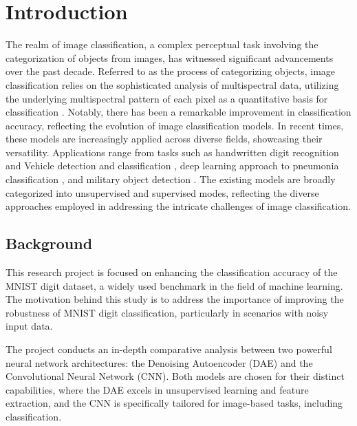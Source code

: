 \chapter{Introduction}
\label{ch:into} %
The realm of image classification, a complex perceptual task involving the categorization of objects from images, has witnessed significant advancements over the past decade. Referred to as the process of categorizing objects, image classification relies on the sophisticated analysis of multispectral data, utilizing the underlying multispectral pattern of each pixel as a quantitative basis for classification \cite{lillesand2015remote}. Notably, there has been a remarkable improvement in classification accuracy, reflecting the evolution of image classification models. In recent times, these models are increasingly applied across diverse fields, showcasing their versatility. Applications range from tasks such as handwritten digit recognition \cite{ahlawat2020improved} and  Vehicle detection and classification \cite{tsai2018vehicle}, deep learning approach to pneumonia classification \cite{stephen2019efficient}, and military object detection \cite{janakiramaiah2023military}. The existing models are broadly categorized into unsupervised and supervised modes, reflecting the diverse approaches employed in addressing the intricate challenges of image classification.



\section{Background}
\label{sec:into_back}
This research project is focused on enhancing the classification accuracy of the MNIST digit dataset, a widely used benchmark in the field of machine learning. The motivation behind this study is to address the importance of improving the robustness of MNIST digit classification, particularly in scenarios with noisy input data.

The project conducts an in-depth comparative analysis between two powerful neural network architectures: the Denoising Autoencoder (DAE) and the Convolutional Neural Network (CNN). Both models are chosen for their distinct capabilities, where the DAE excels in unsupervised learning and feature extraction, and the CNN is specifically tailored for image-based tasks, including classification.

